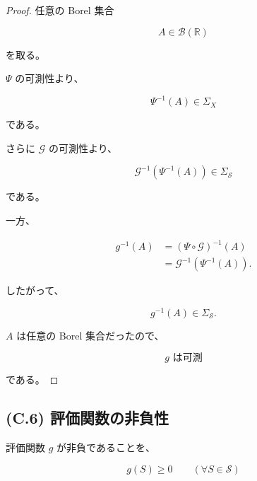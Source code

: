 \documentclass[a4paper,11pt]{article}
\newcommand{\Solver}{\mathcal{S}}
\newcommand{\R}{\mathbb{R}}
\begin{document}
\begin{proof}

任意の Borel 集合

\begin{equation}
    A\in\mathcal{B}(\R)
\end{equation}

を取る。

$\Psi$ の可測性より、

\begin{equation}
    \Psi^{-1}(A)
    \in
    \Sigma_X
\end{equation}

である。

さらに $\mathcal{G}$ の可測性より、

\begin{equation}
    \mathcal{G}^{-1}
    \left(
        \Psi^{-1}(A)
    \right)
    \in
    \Sigma_{\Solver}
\end{equation}

である。

一方、

\begin{align}
    g^{-1}(A)
    &=
    (\Psi\circ\mathcal{G})^{-1}(A)
    \\
    &=
    \mathcal{G}^{-1}
    \left(
        \Psi^{-1}(A)
    \right).
\end{align}

したがって、

\begin{equation}
    g^{-1}(A)
    \in
    \Sigma_{\Solver}.
\end{equation}

$A$ は任意の Borel 集合だったので、

\begin{equation}
    g
    \text{ は可測}
\end{equation}

である。

\end{proof}


\subsection{(C.6) 評価関数の非負性}
\label{subsec:C6}

評価関数 $g$ が非負であることを、

\begin{equation}
    \boxed{
        g(S)\geq0
        \qquad
        (\forall S\in\Solver)
    }
    \label{eq:C-nonnegative}
\end{equation}
\end{document}
